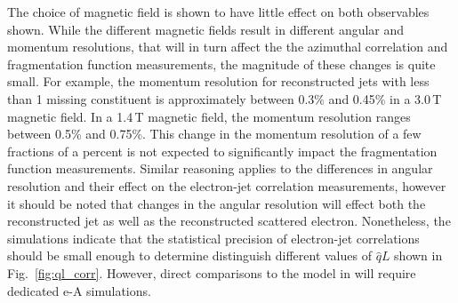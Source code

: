 The choice of magnetic field is shown to have little effect on both observables shown. While the different  magnetic fields result in different angular and momentum resolutions, that will in turn affect the the azimuthal correlation and fragmentation function measurements, the magnitude of these changes is quite small. For example, the momentum resolution for reconstructed jets with less than 1 missing constituent is approximately between 0.3\% and 0.45\% in a 3.0\,T magnetic field. In a 1.4\,T magnetic field, the momentum resolution ranges between 0.5\% and 0.75\%. This change in the momentum resolution of a few fractions of a percent is not expected to significantly impact the fragmentation function measurements. Similar reasoning applies to the differences in angular resolution and their effect on the electron-jet correlation measurements, however it should be noted that changes in the angular resolution will effect both the reconstructed jet as well as the reconstructed scattered electron. Nonetheless, the simulations indicate that the statistical precision of electron-jet correlations should be small enough to determine distinguish different values of $\hat{q}L$ shown in Fig.~\ref{fig:ql_corr}. However, direct comparisons to the model in \cite{Liu2019} will require dedicated e-A simulations.

